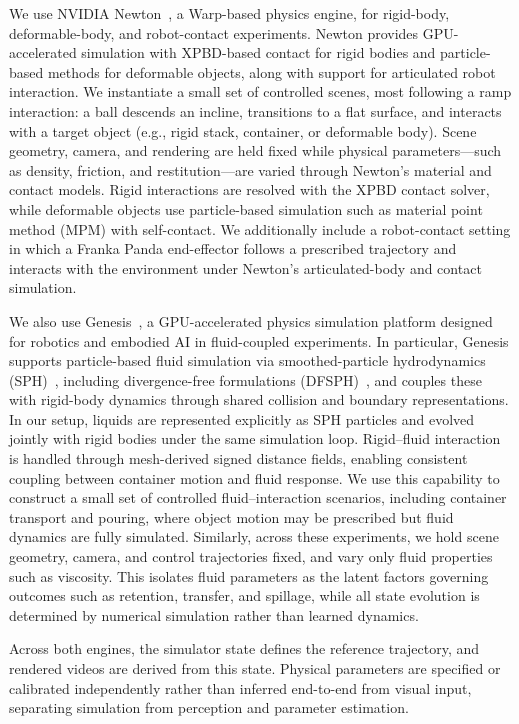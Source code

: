 \documentclass{article}
\begin{document}
We use NVIDIA Newton~\cite{The_Newton_Contributors_Newton_GPU-accelerated_physics_2025}, a Warp-based physics engine, for rigid-body, deformable-body, and robot-contact experiments. Newton provides GPU-accelerated simulation with XPBD-based contact for rigid bodies and particle-based methods for deformable objects, along with support for articulated robot interaction.
We instantiate a small set of controlled scenes, most following a ramp interaction: a ball descends an incline, transitions to a flat surface, and interacts with a target object (e.g., rigid stack, container, or deformable body). Scene geometry, camera, and rendering are held fixed while physical parameters—such as density, friction, and restitution—are varied through Newton’s material and contact models.
Rigid interactions are resolved with the XPBD contact solver, while deformable objects use particle-based simulation such as material point method (MPM) with self-contact. We additionally include a robot-contact setting in which a Franka Panda end-effector follows a prescribed trajectory and interacts with the environment under Newton’s articulated-body and contact simulation.

We also use Genesis~\cite{Genesis}, a GPU-accelerated physics simulation platform designed for robotics and embodied AI in fluid-coupled experiments. In particular, Genesis supports particle-based fluid simulation via smoothed-particle hydrodynamics (SPH)~\cite{monaghan2005smoothed}, including divergence-free formulations (DFSPH)~\cite{bender2015divergence}, and couples these with rigid-body dynamics through shared collision and boundary representations.
In our setup, liquids are represented explicitly as SPH particles and evolved jointly with rigid bodies under the same simulation loop. Rigid–fluid interaction is handled through mesh-derived signed distance fields, enabling consistent coupling between container motion and fluid response. We use this capability to construct a small set of controlled fluid–interaction scenarios, including container transport and pouring, where object motion may be prescribed but fluid dynamics are fully simulated.
Similarly, across these experiments, we hold scene geometry, camera, and control trajectories fixed, and vary only fluid properties such as viscosity. This isolates fluid parameters as the latent factors governing outcomes such as retention, transfer, and spillage, while all state evolution is determined by numerical simulation rather than learned dynamics.

Across both engines, the simulator state defines the reference trajectory, and rendered videos are derived from this state. Physical parameters are specified or calibrated independently rather than inferred end-to-end from visual input, separating simulation from perception and parameter estimation.
\end{document}
